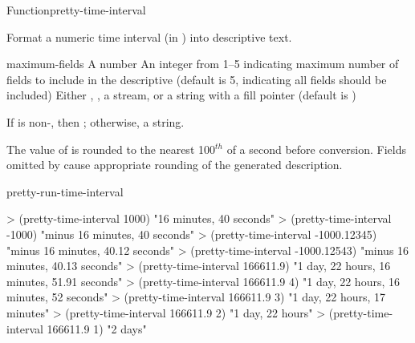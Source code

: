 \documentclass[10pt,twoside,english,pdftex]{article}
\begin{document}
\begin{functiondoc}{Function}{pretty-time-interval}{%
      
    \returns{} }
% 

\fnsyntax

\fnpurpose Format a numeric time interval (in ) into
descriptive text.

\fnpackage {}

\fnmodule {}

\fnargs
\begin{args}{maximum-fields}
\arg[seconds] A number
 An integer from 1--5 indicating maximum number of fields 
to include in the descriptive  (default is 5, indicating all 
fields should be included)
\arg[destination] Either \nil, , a stream, or a string with a fill 
pointer (default is \nil)
\end{args}

\fnreturns If  is non-\nil, then \nil; otherwise, a string.

\fndescription The value of  is rounded to the nearest
100$^{th}$ of a second before conversion.  Fields omitted by
 cause appropriate rounding of the generated
description.

\begin{alsos}{pretty-run-time-interval}
\end{alsos}

\fnexamples
%
\W\supp
\begin{example}
> (pretty-time-interval 1000)
"16 minutes, 40 seconds"
> (pretty-time-interval -1000)
"minus 16 minutes, 40 seconds"
> (pretty-time-interval -1000.12345)
"minus 16 minutes, 40.12 seconds"
> (pretty-time-interval -1000.12543)
"minus 16 minutes, 40.13 seconds"\goodpagebreak
> (pretty-time-interval 166611.9)
"1 day, 22 hours, 16 minutes, 51.91 seconds"
> (pretty-time-interval 166611.9 4)
"1 day, 22 hours, 16 minutes, 52 seconds"
> (pretty-time-interval 166611.9 3)
"1 day, 22 hours, 17 minutes"
> (pretty-time-interval 166611.9 2)
"1 day, 22 hours"
> (pretty-time-interval 166611.9 1)
"2 days"
\end{example}

\end{functiondoc}

\end{document}
